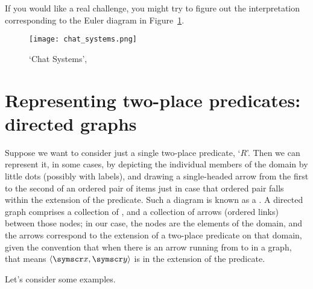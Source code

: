 \begin{earg}
If you would like a real challenge, you might try to figure out the interpretation corresponding to the Euler diagram in Figure~\ref{fig:xkcd}. 
\begin{figure}[b]
	\texttt{[image: chat\_systems.png]}
\caption{`Chat Systems', \label{fig:xkcd}}
\end{figure}

\section{Representing two-place predicates: directed graphs} \label{graph}

Suppose we want to consider just a single two-place predicate, `$R$'. Then we can represent it, in some cases, by depicting the individual members of the domain by little dots (possibly with labels), and drawing a single-headed arrow from the first to the second of an ordered pair of items just in case that ordered pair falls within the extension of the predicate. Such a diagram is known as a . A directed graph comprises a collection of , and a collection of arrows (ordered links) between those nodes; in our case, the nodes are the elements of the domain, and the arrows correspond to the extension of a two-place predicate on that domain, given the convention that when there is an arrow running from  to  in a graph, that means $\langle \meta{x}, \meta{y}\rangle$ is in the extension of the predicate.  

Let's consider some examples.


\end{earg}
